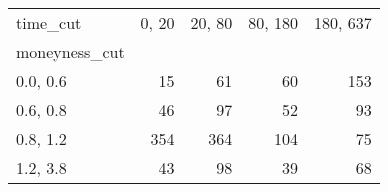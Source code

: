 \begin{tabular}{lrrrr}
\toprule
time\_cut &  0, 20 &  20, 80 &  80, 180 &  180, 637 \\
moneyness\_cut &          &           &            &             \\
\midrule
0.0, 0.6    &       15 &        61 &         60 &         153 \\
0.6, 0.8    &       46 &        97 &         52 &          93 \\
0.8, 1.2    &      354 &       364 &        104 &          75 \\
1.2, 3.8    &       43 &        98 &         39 &          68 \\
\bottomrule
\end{tabular}
